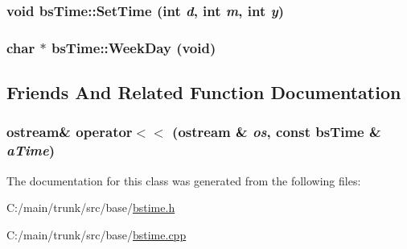 \label{classbs_time_ac182063c47984a4f6cfd9461c0e86f2e}
\hypertarget{classbs_time_add0778d27e5bad3ddd27d4a049c9d645}{
\subsubsection[{SetTime}]{\setlength{\rightskip}{0pt plus 5cm}void bsTime::SetTime (int {\em d}, \/  int {\em m}, \/  int {\em y})}}
\label{classbs_time_add0778d27e5bad3ddd27d4a049c9d645}
\hypertarget{classbs_time_a1d544b0f50378bb2f1589423ae341199}{
\subsubsection[{WeekDay}]{\setlength{\rightskip}{0pt plus 5cm}char $\ast$ bsTime::WeekDay (void)}}
\label{classbs_time_a1d544b0f50378bb2f1589423ae341199}


\subsection{Friends And Related Function Documentation}
\hypertarget{classbs_time_a1c425c2199767868265d604dfb2ee400}{
\subsubsection[{operator$<$$<$}]{\setlength{\rightskip}{0pt plus 5cm}ostream\& operator$<$$<$ (ostream \& {\em os}, \/  const {\bf bsTime} \& {\em aTime})}}
\label{classbs_time_a1c425c2199767868265d604dfb2ee400}


The documentation for this class was generated from the following files:\begin{DoxyCompactItemize}
\item 
C:/main/trunk/src/base/\hyperlink{bstime_8h}{bstime.h}\item 
C:/main/trunk/src/base/\hyperlink{bstime_8cpp}{bstime.cpp}\end{DoxyCompactItemize}
